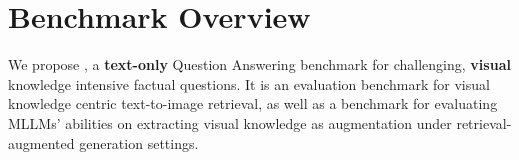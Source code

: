\section{Benchmark Overview}
\label{sec:overview}
\vspace{-0.5em}
We propose \dsns, a \textbf{text-only} Question Answering benchmark for challenging, \textbf{visual} knowledge intensive factual questions. It is an evaluation benchmark for visual knowledge centric text-to-image retrieval, as well as a benchmark for evaluating MLLMs' abilities on extracting visual knowledge as augmentation under retrieval-augmented generation settings. 

\vspace{-0.3em}
